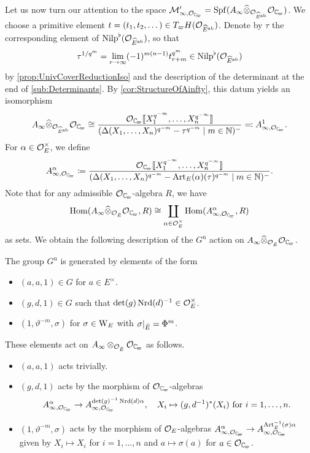 \documentclass[../main.tex]{subfiles}
\begin{document}
Let us now turn our attention to the space 
$\cM_{\infty,\cO_\Cp}' = \spf(A_\infty \cotimes_{\cO_{\hat E^\ab}} \cO_\Cp)$. 
We choose a primitive element $t = (t_1, t_2, \dots) \in T_\varpi H(\mathcal{O}_{\widehat
E^{\mathrm{ab}}})$. Denote by $\tau$ the corresponding element of ${\mathrm{Nilp}}^\flat(\mathcal{O}_{\widehat E^{\mathrm{ab}}})$,
so that
$$\tau^{1/q^m} = \lim_{r \to \infty} (-1)^{m(n-1)}t_{r+m}^{q^{m}}  \in
{\mathrm{Nilp}}^\flat(\mathcal{O}_{\widehat E^{\mathrm{ab}}})$$
by \cref{prop:UnivCoverReductionIso} and the description of the determinant at the end
of \cref{sub:Determinants}. 
By \cref{cor:StructureOfAinfty}, this datum yields an isomorphism
\begin{equation*}
  A_\infty \cotimes_{\cO_{\hat E^\ab}} \cO_\Cp \cong 
  \frac{\cO_\Cp\llbr X_1^{q^{-\infty}}, \dots, X_n^{q^{-\infty}} \rrbr }{
  (\Delta(X_1, \dots, X_n)^{q^{-m}} - \tau^{q^{-m}} \mid m \in \N)^-} \eqcolon
  A_{\infty, \cO_\Cp}^{1}.
\end{equation*}
For $\alpha \in \mathcal{O}_{E}^\times$, we define
\begin{equation*}
  A_{\infty, \cO_\Cp}^{\alpha} \coloneqq
  \frac{\cO_\Cp\llbr X_1^{q^{-\infty}}, \dots, X_n^{q^{-\infty}} \rrbr }{
  (\Delta(X_1, \dots, X_n)^{q^{-m}} - \Art_E(\alpha)(\tau)^{q^{-m}} \mid m \in \N)^-}.
\end{equation*}
Note that for any admissible $\cO_\Cp$-algebra $R$, we have
\begin{equation*}
  \Hom(A_\infty \cotimes_{\cO_\br E} \cO_\Cp, R) 
  \cong \coprod_{\alpha \in \cO_E^\times} \Hom(A_{\infty,\cO_\Cp}^{\alpha}, R)
\end{equation*}
as sets. We obtain the following description of the $G^{\mathrm u}$ action on
$A_{\infty}\cotimes_{\cO_\br E} \cO_\Cp$.
\begin{prop}\label{prop:ExplicitDescriptionOfActionOnAinfty}
  The group $G^{\mathrm u}$ is generated by elements of the form
  \begin{itemize}
    \item $(a, a, 1) \in G$ for $a \in E^\times$.
    \item $(g, d, 1) \in G$ such that $\det(g) \operatorname{Nrd}(d)^{-1} \in \mathcal{O}_E^\times$.
    \item $(1, \vartheta^{-m}, \sigma)$ for $\sigma \in \mathrm W_E$ with
      $\sigma|_{{\breve {E}}} = \Phi^m$. 
  \end{itemize}
  These elements act on $A_{\infty} \otimes_{\cO_\br E} \cO_\Cp$ as follows.
  \begin{itemize}
    \item $(a,a,1)$ acts trivially.
    \item $(g,d,1)$ acts by the morphism of $\cO_\Cp$-algebras
      $$A_{\infty, \cO_\Cp}^\alpha \to A_{\infty, \cO_\Cp}^{\det(g)^{-1} \Nrd(d) \alpha},
    \quad X_i \mapsto (g,d^{-1})^*(X_i) \ \text{for} \ i = 1, \dots,n.$$
    \item $(1, \vartheta^{-m}, \sigma)$ acts by the morphism of $\mathcal{O}_E$-algebras 
      $A_{\infty, \cO_\Cp}^\alpha \to A_{\infty, \cO_\Cp}^{\Art_E^{-1}(\sigma)\alpha}$
      given by $X_i \mapsto X_i$ for $i = 1, \dots, n$ and $a \mapsto
      \sigma(a)$ for $a \in \cO_\Cp$.
  \end{itemize}
\end{prop}
\end{document}
